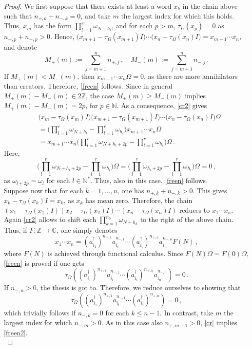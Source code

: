 \documentclass[10pt,a4paper]{amsart}
\def\Om{\Omega}
\def\bc{{\mathbb C}}
\def\bn{{\mathbb N}}
\def\bz{{\mathbb Z}}
\def\om{\omega} \def\Om{\Omega}
\def\t{\tau}
\begin{document}
\begin{proof}
We first suppose that there exists at least a word $x_k$ in the chain
above such that $n_{+,k}+n_{-,k}=0$, and take $m$ the largest index
for which this holds. Thus, $x_m$ has the form
$\displaystyle{\prod_{l=1}^r\om_{N+h_l}}$, and for each $p>m$,
$\t_\Om(x_p)=0$ as $n_{+,p}+n_{-,p}>0$. Hence,
$\big(x_{m+1}-\t_\Om(x_{m+1})I\big)\cdots\big(x_{n}-\t_\Om(x_{n})I\big)=x_{m+1}\cdots
x_n$, and denote
$$
\displaystyle{M_+(m):=\sum_{j=m+1}^n n_{+,j}}\,, \quad \displaystyle{M_-(m):=\sum_{j=m+1}^n n_{-,j}}\,.
$$
If $M_+(m)<M_-(m)$, then $x_{m+1}\cdots x_n\Om=0$, as there are more annihilators than creators. Therefore, \eqref{freen} follows. Since in general $M_+(m)-M_-(m)\in 2\bz$, the case $M_+(m)\geq M_-(m)$ implies $M_+(m)-M_-(m)=2p$, for $p\in\bn$. As a consequence, \eqref{cr2} gives
\begin{align*}
&(x_{m}-\t_\Om(x_{m})I\big)\big(x_{m+1}-\t_\Om(x_{m+1})I\big)\cdots\big(x_{n}-\t_\Om(x_{n})I\big)\Om\\
&= \bigg(\prod_{l=1}^r\om_{N+h_l}-\prod_{l=1}^r\om_{h_l}\bigg)x_{m+1}\cdots x_n\Om\\
&=x_{m+1}\cdots x_n\bigg(\prod_{l=1}^r\om_{N+h_l+2p}-\prod_{l=1}^r\om_{h_l}\bigg)\Om\,.
\end{align*}
Here,
$$
\displaystyle{\bigg(\prod_{l=1}^r\om_{N+h_l+2p}-\prod_{l=1}^r\om_{h_l}\bigg)\Om=\bigg(\prod_{l=1}^r\om_{h_l+2p}-\prod_{l=1}^r\om_{h_l}\bigg)\Om}=0\,,
$$
as $\om_{l+2p}=\om_l$ for each $l\in\bn^*$. Thus, also in this case, \eqref{freen} follows.\\
Suppose now that for each $k=1,\ldots, n$, one has $n_{+,k}+n_{-,k}>0$. This gives $x_k-\t_\Om(x_k)I=x_k$, as $x_k$ has mean zero. Therefore, the chain $(x_1-\t_\Om(x_1)I)(x_2-\t_\Om(x_2)I)\cdots (x_n-\t_\Om(x_n)I)$ reduces to $x_1\cdots x_n$. Again \eqref{cr2} allows to shift each $\prod_{k=1}^{n_0}\om_{N+h_k}$ to the right of the above chain. Thus, if $F:\bz\rightarrow \bc$, one simply denotes
$$
x_1\cdots x_n=(a^\dag_{i_1})^{n_{+,1}}a_{i_i}^{n_{-,1}}\cdots (a^\dag_{i_i})^{n_{+,n}}a_{i_n}^{n_{-,n}}F(N)\,,
$$
where $F(N)$ is achieved through functional calculus.
Since $F(N)\Om=F(0)\Om$, \eqref{freen} is proved if one gets
$$
\t_\Om((a^\dag_{i_1})^{n_{+,1}}a_{i_i}^{n_{-,1}}\cdots (a^\dag_{i_i})^{n_{+,n}}a_{i_n}^{n_{-,n}})=0\,.
$$
If $n_{-,n}>0$, the thesis is got to. Therefore, we reduce ourselves to showing that
\begin{equation}\label{freen2}
\t_\Om((a^\dag_{i_1})^{n_{+,1}}a_{i_i}^{n_{-,1}}\cdots (a^\dag_{i_i})^{n_{+,n}})=0\,,
\end{equation}
which trivially follows if $n_{-,k}=0$ for each $k\leq n-1$. In contrast, take $m$ the largest index for which $n_{-,m}>0$. As in this case also $n_{+,m+1}>0$, \eqref{cr} implies \eqref{freen2}.\\

\end{proof}
\end{document}
